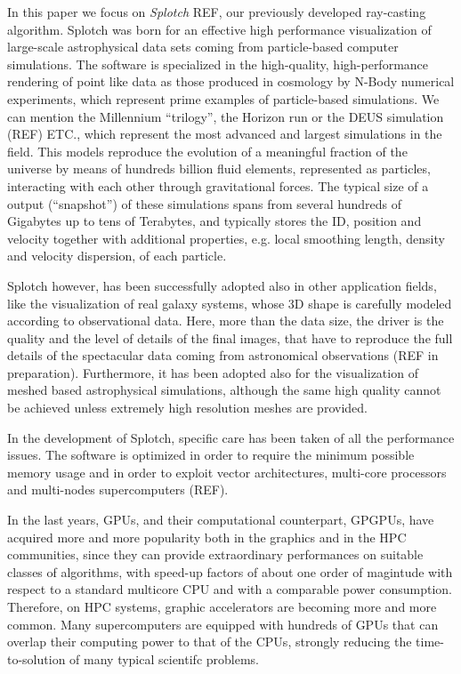 \documentclass[11pt]{article}
\begin{document}
In this paper we focus on {\it Splotch} REF, our previously developed ray-casting
algorithm. Splotch was born for an effective high performance visualization of large-scale 
astrophysical data sets coming from particle-based computer simulations. The software is 
specialized in the high-quality, high-performance rendering of point like data as those 
produced in cosmology by N-Body numerical experiments, which 
represent prime examples of particle-based simulations. We can mention 
the Millennium ``trilogy'', the Horizon run or the DEUS simulation (REF) ETC., which
represent the most advanced and largest simulations in the field. 
This models reproduce the evolution of a meaningful fraction
of the universe by means of hundreds billion fluid elements, represented as particles,
interacting with each other through gravitational
forces. The typical size of a output (``snapshot'') of these simulations spans from several hundreds 
of Gigabytes up to tens of Terabytes, and typically stores the
ID, position and velocity together with additional properties, e.g.
local smoothing length, density and velocity dispersion, of each particle.

Splotch however, has been successfully adopted also in other application fields,
like the visualization of real galaxy systems, whose 3D shape is carefully modeled
according to observational data. Here, more than the data size, the driver is
the quality and the level of details of the final images,
that have to reproduce the full details of the
spectacular data coming from astronomical observations (REF in preparation). Furthermore,
it has been adopted also for the visualization of meshed based astrophysical simulations, 
although the same high quality cannot be achieved unless extremely high resolution
meshes are provided. 

In the development of Splotch, specific care has been taken of all the performance 
issues. The software is optimized in order to require the minimum possible
memory usage and in order to exploit vector architectures, multi-core processors 
and multi-nodes supercomputers (REF). 

In the last years, 
GPUs, and their computational counterpart, GPGPUs, have 
acquired more and more popularity both in the graphics and in the HPC 
communities, since they can provide extraordinary performances on suitable
classes of algorithms, with speed-up factors of about one order of magintude with respect to 
a standard multicore CPU and with a comparable power consumption.
Therefore, on HPC systems, graphic accelerators are becoming more and more common. 
Many supercomputers are equipped with hundreds of GPUs that can overlap 
their computing power to that of the CPUs, strongly reducing the time-to-solution
of many typical scientifc problems.
\end{document}

